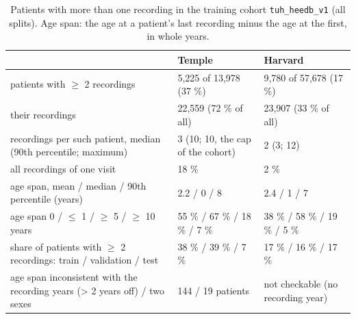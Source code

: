 \documentclass[11pt,a4paper]{article}
\begin{document}
\begin{table}[t]
\centering
\small
\caption{Patients with more than one recording in the training cohort \texttt{tuh\_heedb\_v1} (all splits). Age span: the age at a patient's last recording minus the age at the first, in whole years.}
\begin{tabular}{lll}
\toprule
\textbf{} & \textbf{Temple} & \textbf{Harvard} \\
\midrule
patients with $\ge$ 2 recordings & 5,225 of 13,978 (37 \%) & 9,780 of 57,678 (17 \%) \\
their recordings & 22,559 (72 \% of all) & 23,907 (33 \% of all) \\
recordings per such patient, median (90th percentile; maximum) & 3 (10; 10, the cap of the cohort) & 2 (3; 12) \\
all recordings of one visit & 18 \% & 2 \% \\
age span, mean / median / 90th percentile (years) & 2.2 / 0 / 8 & 2.4 / 1 / 7 \\
age span 0 / $\le$ 1 / $\ge$ 5 / $\ge$ 10 years & 55 \% / 67 \% / 18 \% / 7 \% & 38 \% / 58 \% / 19 \% / 5 \% \\
share of patients with $\ge$ 2 recordings: train / validation / test & 38 \% / 39 \% / 7 \% & 17 \% / 16 \% / 17 \% \\
age span inconsistent with the recording years (> 2 years off) / two sexes & 144 / 19 patients & not checkable (no recording year) \\
\bottomrule
\end{tabular}
\end{table}


\begin{table}[t]
\centering
\small
\caption{Patients recorded at different ages in a scored set: the change of the predicted age between the youngest and the oldest recording, $\Delta\hat y$, against the age difference $\Delta y$. \texttt{slope}: least-squares slope of $\Delta\hat y$ on $\Delta y$ through the origin (1 = the model follows ageing fully; the cross-sectional slopes of the P4 ensemble in Table 19 are 0.79 to 0.89 on the cohorts that resemble the training data); \texttt{older}: share of patients predicted older at the later recording (P4 ensemble). In-domain sets: first 5 minutes; external: every window.}
\end{table}
\end{document}
